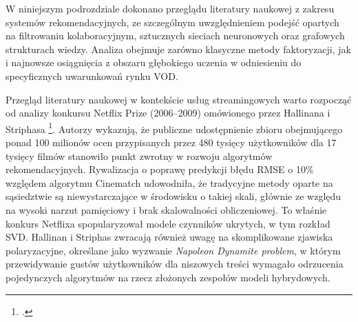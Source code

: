 W niniejszym podrozdziale dokonano przeglądu literatury naukowej z zakresu systemów rekomendacyjnych, ze szczególnym uwzględnieniem podejść opartych na filtrowaniu kolaboracyjnym, sztucznych sieciach neuronowych oraz grafowych strukturach wiedzy. Analiza obejmuje zarówno klasyczne metody faktoryzacji, jak i najnowsze osiągnięcia z obszaru głębokiego uczenia w odniesieniu do specyficznych uwarunkowań rynku VOD.

Przegląd literatury naukowej w kontekście usług streamingowych warto rozpocząć od analizy konkursu Netflix Prize (2006--2009) omówionego przez Hallinana i Striphasa \footcite{hallinanRecommendedYouNetflix2016}. Autorzy wykazują, że publiczne udostępnienie zbioru obejmującego ponad 100 milionów ocen przypisanych przez 480 tysięcy użytkowników dla 17 tysięcy filmów stanowiło punkt zwrotny w rozwoju algorytmów rekomendacyjnych. Rywalizacja o poprawę predykcji błędu RMSE o 10\% względem algorytmu Cinematch udowodniła, że tradycyjne metody oparte na sąsiedztwie są niewystarczające w środowisku o takiej skali, głównie ze względu na wysoki narzut pamięciowy i brak skalowalności obliczeniowej. To właśnie konkurs Netflixa spopularyzował modele czynników ukrytych, w tym rozkład SVD. Hallinan i Striphas zwracają również uwagę na skomplikowane zjawiska polaryzacyjne, określane jako wyzwanie \textit{Napoleon Dynamite problem}, w którym przewidywanie gustów użytkowników dla niszowych treści wymagało odrzucenia pojedynczych algorytmów na rzecz złożonych zespołów modeli hybrydowych.

